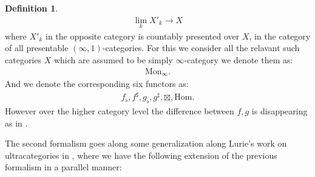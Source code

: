 \documentclass[12pt]{article}
\theoremstyle{definition}
\newtheorem{definition}{Definition}
\begin{document}
\begin{definition}
\begin{align}
\lim_k X'_k \rightarrow X
\end{align}
where $X'_k$ in the opposite category is countably presented over $X$, in the category of all presentable $(\infty,1)$-categories. For this we consider all the relavant such categories $X$ which are assumed to be simply $\infty$-category we denote them as:
\begin{align}
\mathrm{Mon}_\infty.
\end{align}
And we denote the corresponding six functors as:
\begin{align}
f_\flat, f^\sharp, g_\flat, g^\sharp, \boxtimes, \mathrm{Hom}.  
\end{align}
However over the higher category level the difference between $f,g$ is disappearing as in \cite{5S5}. 
\end{definition}


The second formalism goes along some generalization along Lurie's work on ultracategories in \cite{5Lu3}, where we have the following extension of the previous formalism in a parallel manner:
\end{document}
